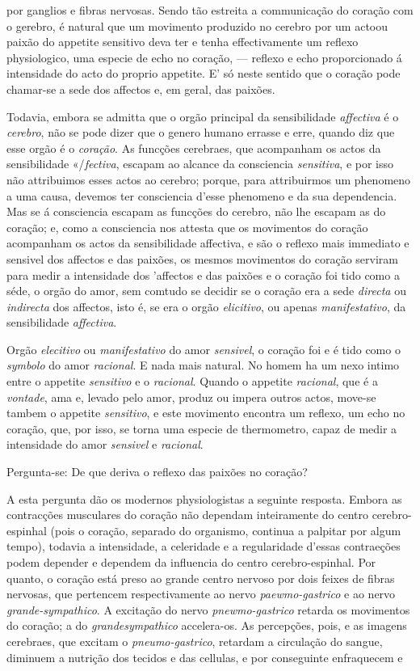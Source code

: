 por ganglios e fibras nervosas. Sendo tão estreita a communicação do coração com o gerebro, é natural que um movimento produzido no cerebro por um actoou paixão do appetite sensitivo deva ter e tenha effectivamente um reflexo physiologico, uma especie de echo no coração, --- reflexo e echo proporcionado á intensidade do acto do proprio appetite. E' só neste sentido que o coração pode chamar-se a sede dos affectos e, em geral, das paixões.\par Todavia, embora se admitta que o orgão principal da sensibilidade \emph{affectiva} é o \emph{cerebro}, não se pode dizer que o genero humano errasse e erre, quando diz que esse orgão é o \emph{coração}. As funcções cerebraes, que acompanham os actos da sensibilidade «/\emph{fectiva}, escapam ao alcance da consciencia \emph{sensitiva}, e por isso não attribuimos esses actos ao cerebro; porque, para attribuirmos um phenomeno a uma causa, devemos ter consciencia d'esse phenomeno e da sua dependencia. Mas se á consciencia escapam as funcções do cerebro, não lhe escapam as do coração; e, como a consciencia nos attesta que os movimentos do coração acompanham os actos da sensibilidade affectiva, e são o reflexo mais immediato e sensivel dos affectos e das paixões, os mesmos movimentos do coração serviram para medir a intensidade dos 'affectos e das paixões e o coração foi tido como a séde, o orgão do amor, sem comtudo se decidir se o coração era a sede \emph{directa} ou \emph{indirecta} dos affectos, isto é, se era o orgão \emph{elicitivo}, ou apenas \emph{manifestativo}, da sensibilidade \emph{affectiva}.\par Orgão \emph{elecitivo} ou \emph{manifestativo} do amor \emph{sensivel}, o coração foi e é tido como o \emph{symbolo} do amor \emph{racional}. E nada mais natural. No homem ha um nexo intimo entre o appetite \emph{sensitivo} e o \emph{racional}. Quando o appetite \emph{racional}, que é a \emph{vontade}, ama e, levado pelo amor, produz ou impera outros actos, move-se tambem o appetite \emph{sensitivo}, e este movimento encontra um reflexo, um echo no coração, que, por isso, se torna uma especie de thermometro, capaz de medir a intensidade do amor \emph{sensivel} e \emph{racional}.\par Pergunta-se: De que deriva o reflexo das paixões no coração?\par A esta pergunta dão os modernos physiologistas a seguinte resposta. Embora as contracções musculares do coração não dependam inteiramente do centro cerebro-espinhal (pois o coração, separado do organismo, continua a palpitar por algum tempo), todavia a intensidade, a celeridade e a regularidade d'essas contraeções podem depender e dependem da influencia do centro cerebro-espinhal. Por quanto, o coração está preso ao grande centro nervoso por dois feixes de fibras nervosas, que pertencem respectivamente ao nervo \emph{paewmo-gastrico} e ao nervo \emph{grande-sympathico}. A excitação do nervo \emph{pnewmo-gastrico} retarda os movimentos do coração; a do \emph{grandesympathico} accelera-os. As percepções, pois, e as imagens cerebraes, que excitam o \emph{pneumo-gastrico}, retardam a circulação do sangue, diminuem a nutrição dos tecidos e das cellulas, e por conseguinte enfraquecem e 